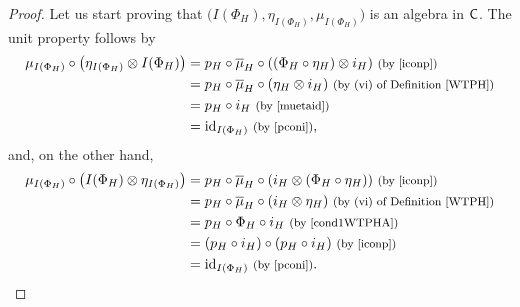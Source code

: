 \documentclass[10pt,a4paper]{amsart}
\numberwithin{equation}{section}
\begin{document}
\begin{proof}Let us start proving that $\bigl(I(\Phi_{H}),\eta_{I(\Phi_{H})},\mu_{I(\Phi_{H})}\bigr)$ is an algebra in $\sf{C}$. The unit property follows by
\begin{align*}
\mu_{I(\Phi_{H})}\circ\bigl(\eta_{I(\Phi_{H})}\otimes I(\Phi_{H})\bigr)
={}&p_{H}\circ\overline{\mu}_{H}\circ((\Phi_{H}\circ \eta_{H})\otimes i_{H})\ \text{\footnotesize\textnormal{(by \eqref{iconp})}}\\
={}&p_{H}\circ\overline{\mu}_{H}\circ(\eta_{H}\otimes i_{H})\ \text{\footnotesize\textnormal{(by (vi) of Definition \ref{WTPH})}}\\
={}&p_{H}\circ i_{H}\ \text{\footnotesize\textnormal{(by \eqref{muetaid})}}\\
={}&{\rm id}_{I(\Phi_{H})}\ \text{\footnotesize\textnormal{(by \eqref{pconi})}},
\end{align*}
and, on the other hand,
\begin{align*}
\mu_{I(\Phi_{H})}\circ\bigl(I(\Phi_{H})\otimes \eta_{I(\Phi_{H})}\bigr)
={}&p_{H}\circ\overline{\mu}_{H}\circ(i_{H}\otimes(\Phi_{H}\circ\eta_{H}))\ \text{\footnotesize\textnormal{(by \eqref{iconp})}}\\
={}&p_{H}\circ\overline{\mu}_{H}\circ(i_{H}\otimes\eta_{H})\ \text{\footnotesize\textnormal{(by (vi) of Definition \ref{WTPH})}}\\
={}&p_{H}\circ \Phi_{H}\circ i_{H}\ \text{\footnotesize\textnormal{(by \eqref{cond1WTPHA})}}\\
={}&(p_{H}\circ i_{H})\circ(p_{H}\circ i_{H})\ \text{\footnotesize\textnormal{(by \eqref{iconp})}}\\
={}&{\rm id}_{I(\Phi_{H})}\ \text{\footnotesize\textnormal{(by \eqref{pconi})}}.
\end{align*}


\end{proof}
\end{document}
